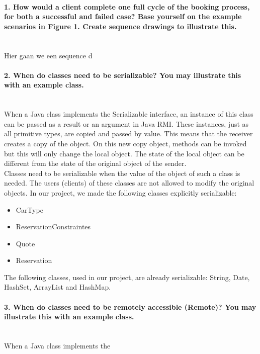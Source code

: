 \documentclass{ds-report}
\begin{document}
	\maketitle

	\paragraph{1. How would a client complete one full cycle of the booking process, for both a successful and
failed case? Base yourself on the example scenarios in Figure 1. Create sequence drawings to
illustrate this.} \mbox{}\\
	Hier gaan we een sequence d
	
	\paragraph{2. When do classes need to be serializable? You may illustrate this with an example class.} \mbox{}\\
When a Java class implements the Serializable interface, an instance of this class can be passed as a result or an argument in Java RMI. These instances, just as all primitive types, are copied and passed by value. This means that the receiver creates a copy of the object. On this new copy object, methods can be invoked but this will only change the local object. The state of the local object can be different from the state of the original object of the sender. \\
Classes need to be serializable when the value of the object of such a class is needed. The users (clients) of these classes are not allowed to modify the original objects. In our project, we made the following classes explicitly serializable:
\begin{itemize}
	\item CarType 
	\item ReservationConstraintes 
	\item Quote
	\item Reservation
\end{itemize}
The following classes, used in our project, are already serializable: String, Date, HashSet, ArrayList and HashMap.

	\paragraph{3. When do classes need to be remotely accessible (Remote)? You may illustrate this with an example
class.} \mbox{}\\
When a Java class implements the 
\end{document}
